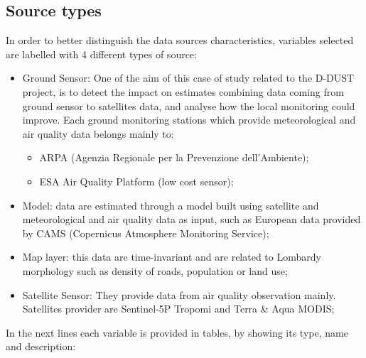 \subsection{Source types}
In order to better distinguish the data sources characteristics, variables selected are labelled with 4 different types of source:
\begin{itemize}

\item Ground Sensor: One of the aim of this case of study related to the D-DUST project, is to detect the impact on estimates combining data coming from ground sensor to satellites data, and analyse how the local monitoring could improve.  
Each ground monitoring stations which provide meteorological and air quality data belongs mainly to: 
\begin{itemize}
    \item ARPA (Agenzia Regionale per la Prevenzione dell'Ambiente);
    \item ESA Air Quality Platform (low cost sensor)\cite{esasensor};
\end{itemize}  
\item Model: data are estimated through a model built using satellite and meteorological and air quality data as input, such as European data provided by CAMS (Copernicus Atmosphere Monitoring Service);
\item Map layer: this data are time-invariant and are related to Lombardy morphology such as density of roads, population or land use; 
\item Satellite Sensor: They provide data from air quality observation mainly. Satellites provider are Sentinel-5P Tropomi and Terra \& Aqua MODIS;
\end{itemize}
\bigbreak

In the next lines each variable is provided in tables, by showing its type, name and description:

